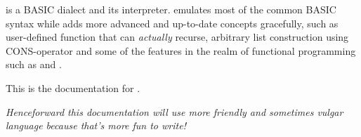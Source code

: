 \tbas{} is a BASIC dialect and its interpreter. \tbas{} emulates most of the common BASIC syntax while adds more advanced and up-to-date concepts gracefully, such as user-defined function that can \emph{actually} recurse, arbitrary list construction using CONS-operator and some of the features in the realm of functional programming such as  and .

This is the documentation for \tbas{} \tbasver{}.

\small\emph{Henceforward this documentation will use more friendly and sometimes vulgar language because that's more fun to write!}
